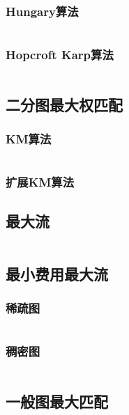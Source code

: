 \documentclass[a4paper]{article}
\newcommand{\cppcode}[1]{
    \inputminted[mathescape]{cpp}{source/#1}
}
\begin{document}
\subsubsection{Hungary算法}

\cppcode{graph-theory/maximum-matching-hungary.cpp}

\subsubsection{Hopcroft Karp算法}

\cppcode{graph-theory/maximum-matching-hopcroft-karp.cpp}

\subsection{二分图最大权匹配}

\subsubsection{KM算法}

\cppcode{graph-theory/maximum-weight-matching.cpp}

\subsubsection{扩展KM算法}

\subsection{最大流}

\cppcode{graph-theory/maximum-flow.cpp}

\subsection{最小费用最大流}

\subsubsection{稀疏图}

\cppcode{graph-theory/minimum-cost-flow-spfa.cpp}

\subsubsection{稠密图}

\cppcode{graph-theory/minimum-cost-flow-zkw.cpp}

\subsection{一般图最大匹配}
\end{document}
